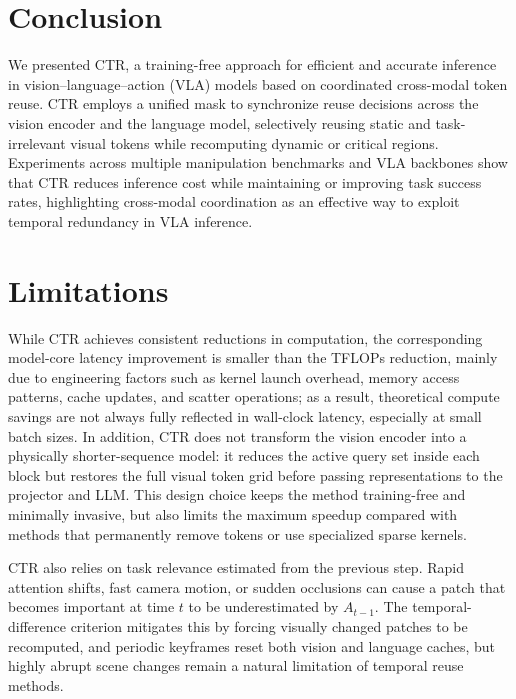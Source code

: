 \documentclass[11pt]{article}
\begin{document}
\section{Conclusion}
We presented CTR, a training-free approach for efficient and accurate inference in vision--language--action (VLA) models based on coordinated cross-modal token reuse.
CTR employs a unified mask to synchronize reuse decisions across the vision encoder and the language model, selectively reusing static and task-irrelevant visual tokens while recomputing dynamic or critical regions.
Experiments across multiple manipulation benchmarks and VLA backbones show that CTR reduces inference cost while maintaining or improving task success rates, highlighting cross-modal coordination as an effective way to exploit temporal redundancy in VLA inference.


\section*{Limitations}

While CTR achieves consistent reductions in computation, the corresponding model-core latency improvement is smaller than the TFLOPs reduction, mainly due to engineering factors such as kernel launch overhead, memory access patterns, cache updates, and scatter operations; as a result, theoretical compute savings are not always fully reflected in wall-clock latency, especially at small batch sizes. In addition, CTR does not transform the vision encoder into a physically shorter-sequence model: it reduces the active query set inside each block but restores the full visual token grid before passing representations to the projector and LLM. This design choice keeps the method training-free and minimally invasive, but also limits the maximum speedup compared with methods that permanently remove tokens or use specialized sparse kernels.

CTR also relies on task relevance estimated from the previous step. Rapid attention shifts, fast camera motion, or sudden occlusions can cause a patch that becomes important at time $t$ to be underestimated by $A_{t-1}$. The temporal-difference criterion mitigates this by forcing visually changed patches to be recomputed, and periodic keyframes reset both vision and language caches, but highly abrupt scene changes remain a natural limitation of temporal reuse methods.





\clearpage
\appendix

\end{document}
